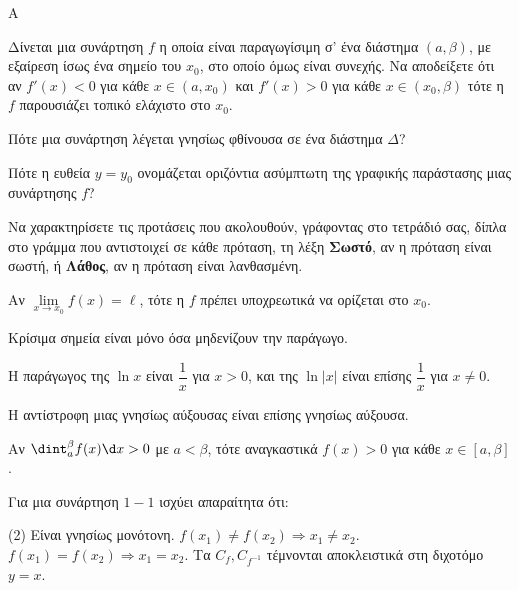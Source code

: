 \begin{thema}{A}
\begin{erwthma}
    \item Δίνεται μια συνάρτηση $ f $ η οποία είναι παραγωγίσιμη σ’ ένα διάστημα $ (a,\beta) $, με
εξαίρεση ίσως ένα σημείο του $ x_0 $, στο οποίο όμως είναι συνεχής. Να αποδείξετε ότι αν $ f'(x)<0 $ για κάθε $ x\in(a,x_0) $ και $ f'(x)>0 $ για κάθε $ x\in(x_0,\beta) $ τότε η $ f $ παρουσιάζει τοπικό ελάχιστο στο $ x_0 $.
    \item Πότε μια συνάρτηση λέγεται γνησίως φθίνουσα σε ένα διάστημα $\Delta$?
    \item Πότε η ευθεία $y=y_0$ ονομάζεται οριζόντια ασύμπτωτη της γραφικής παράστασης μιας συνάρτησης $f$?
    \item Να χαρακτηρίσετε τις προτάσεις που ακολουθούν, γράφοντας στο τετράδιό σας, δίπλα στο γράμμα που αντιστοιχεί σε κάθε πρόταση, τη λέξη \textbf{Σωστό}, αν η πρόταση είναι σωστή, ή \textbf{Λάθος}, αν η πρόταση είναι λανθασμένη.
    \begin{alist}
        \item Αν $\lim\limits_{x \to x_0} f(x) = \ell$, τότε η $f$ πρέπει υποχρεωτικά να ορίζεται στο $x_0$.
        \item Κρίσιμα σημεία είναι μόνο όσα μηδενίζουν την παράγωγο.
        \item Η παράγωγος της $\ln x$ είναι $\dfrac{1}{x}$ για $x>0$, και της $\ln |x|$ είναι επίσης $\dfrac{1}{x}$ για $x \ne 0$.
        \item H αντίστροφη μιας γνησίως αύξουσας είναι επίσης γνησίως αύξουσα.
        \item Αν $\dint_a^\beta f(x)\d x > 0$ με $a < \beta$, τότε αναγκαστικά $f(x) > 0$ για κάθε $x \in [a, \beta]$.
    \end{alist}
    \item Για μια συνάρτηση $1-1$ ισχύει απαραίτητα ότι:
    \begin{tasks}[label=\let\textdexiakeraia\relax\alph*.](2)
        \task Είναι γνησίως μονότονη.
        \task $f(x_1) \ne f(x_2) \Rightarrow x_1 \ne x_2$.
        \task $f(x_1) = f(x_2) \Rightarrow x_1 = x_2$.
        \task Tα $C_f, C_{f^{-1}}$ τέμνονται αποκλειστικά στη διχοτόμο $y=x$.
    \end{tasks}
\end{erwthma}
\end{thema}


